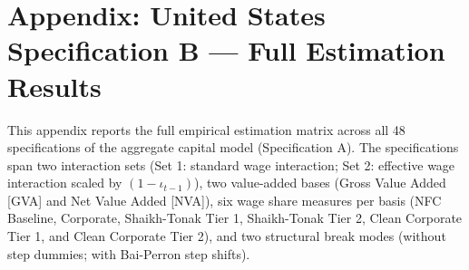 \FloatBarrier
\section{Appendix: United States Specification B --- Full Estimation Results}
\label{app:specA_full_results}

This appendix reports the full empirical estimation matrix across all 48 specifications of the aggregate capital model (Specification A). The specifications span two interaction sets (Set 1: standard wage interaction; Set 2: effective wage interaction scaled by $(1-\iota_{t-1})$), two value-added bases (Gross Value Added [GVA] and Net Value Added [NVA]), six wage share measures per basis (NFC Baseline, Corporate, Shaikh-Tonak Tier 1, Shaikh-Tonak Tier 2, Clean Corporate Tier 1, and Clean Corporate Tier 2), and two structural break modes (without step dummies; with Bai-Perron step shifts).

